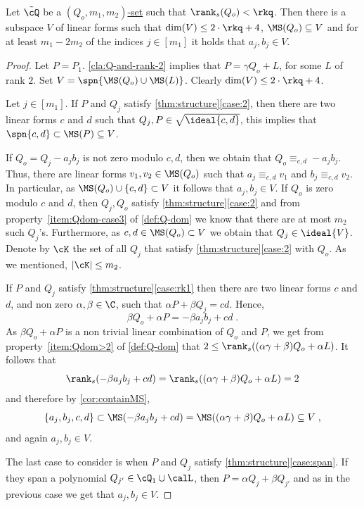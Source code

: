 \begin{claim}\label{cla:m-2k-in-ideal-v}
Let $\tilde{\cQ}$ be a \hyperref[def:Q-dom]{$(Q_o,m_1,m_2)$-set} such that $\rank_s(Q_o)< \rkq$. 
Then there is a subspace $V$ of linear  forms such that $\dim(V) \leq 2\cdot \rkq+4$, $\MS(Q_o)\subseteq V$ and for at least $m_1-2m_2 $ of the indices $j\in[m_1]$ it holds that $a_j,b_j \in V$.
\end{claim}
\begin{proof}
Let $P=P_1$.
\autoref{cla:Q-and-rank-2} implies that $P = \gamma Q_o+L$, for some $L$ of rank $2$. Set $V = \spn{\MS(Q_o)\cup\MS(L)}$. Clearly $\dim(V)\leq 2 \cdot \rkq+4$.

Let $j\in [m_1]$. 
If $P$ and $Q_j$ satisfy \autoref{thm:structure}\ref{case:2}, then there are two linear forms $c$ and $d$ such that  $Q_j,P\in \sqrt{\ideal{c,d}}$, this implies that $\spn{c,d} \subset\MS(P) \subseteq V$. 

If $Q_o=Q_j-a_j b_j$ is not zero modulo ${c,d}$, then we obtain that $Q_o\equiv_{c,d} -a_j b_j$. Thus, there are linear forms $v_1,v_2\in\MS(Q_o)$ such that $a_j \equiv_{c,d} v_1$ and $b_j \equiv_{c,d} v_2$. In particular, as $\MS(Q_o)\cup\{c,d\}\subset V$ it follows that $a_j,b_j\in V$.
If $Q_o$ is zero modulo $c$ and $d$, then $Q_{j},Q_o$ satisfy \autoref{thm:structure}\ref{case:2} and from property~\ref{item:Qdom-case3} of \autoref{def:Q-dom} we know that there are at most $m_2$ such $Q_j$'s. Furthermore, as  $c,d\in\MS(Q_o) \subset V$ we obtain that $Q_j \in \ideal{V}$. Denote by $\cK$ the set of all $Q_j$ that satisfy \autoref{thm:structure}\ref{case:2} with $Q_o$. As we mentioned, $|\cK|\leq m_2$.

If $P$ and $Q_j$ satisfy  \autoref{thm:structure}\ref{case:rk1} then there are two linear forms $c$ and $d$, and non zero $\alpha, \beta \in \C$, such that $\alpha P + \beta Q_j = cd$. Hence,
\begin{equation*}
\beta Q_o+\alpha P=  - \beta a_jb_j +cd\;.
\end{equation*}
As $\beta Q_o+\alpha P$ is a non trivial linear combination of $Q_o$ and $P$, we get from property~\ref{item:Qdom>2} of \autoref{def:Q-dom} that $2 \leq \rank_s((\alpha\gamma+\beta)Q_o+\alpha L)$. It follows that $$\rank_s(- \beta a_jb_j +cd)=\rank_s((\alpha\gamma+\beta)Q_o+\alpha L)= 2$$ and therefore by \autoref{cor:containMS}, $$\{a_j,b_j,c,d\}\subset \MS(-\beta a_jb_j +cd)= \MS((\alpha\gamma+\beta)Q_o+\alpha L)\subseteq V\;,$$ and again $a_j,b_j\in V$.

The last case to consider is when $P$ and $Q_j$ satisfy  \autoref{thm:structure}\ref{case:span}. If they span a polynomial $Q_{j'} \in \cQ_1\cup \calL$,   then $P = \alpha Q_j + \beta Q_{j'}$ and as in the previous case we get that $ a_{j}, b_{j} \in V$.


\end{proof}
